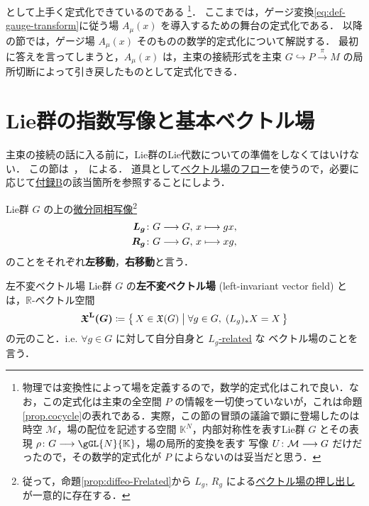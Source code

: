 \documentclass[geometry_main]{subfiles}
\begin{document}
として上手く定式化できているのである
\footnote{
    物理では変換性によって場を定義するので，数学的定式化はこれで良い．なお，この定式化は主束の全空間 $P$ の情報を一切使っていないが，これは命題\ref{prop.cocycle}の表れである．実際，この節の冒頭の議論で顕に登場したのは時空 $\mathcal{M}$，場の配位を記述する空間 $\mathbb{K}^N$，内部対称性を表すLie群 $G$ とその表現 $\rho \colon G \lto \gGL{N}{\mathbb{K}}$，場の局所的変換を表す \cinfty 写像 $U \colon \mathcal{M} \longrightarrow G$ だけだったので，その数学的定式化が $P$ によらないのは妥当だと思う．
}．
ここまでは，ゲージ変換\eqref{eq:def-gauge-transform}に従う場 $A_\mu(x)$ を導入するための舞台の定式化である．
以降の節では，ゲージ場 $A_\mu(x)$ そのものの数学的定式化について解説する．
最初に答えを言ってしまうと，$A_\mu(x)$ は，主束の接続形式を主束 $G \hookrightarrow P \xrightarrow{\pi} M$ の局所切断によって引き戻したものとして定式化できる．

\section{Lie群の指数写像と基本ベクトル場}

主束の接続の話に入る前に，Lie群のLie代数についての準備をしなくてはいけない．
この節は~\cite[Chapter 20]{Lee12}，~\cite[第6章]{Imano}による．
道具として\hyperref[thm:fundamental-flow]{ベクトル場のフロー}を使うので，必要に応じて\hyperref[appendixB]{付録B}の該当箇所を参照することにしよう．

Lie群 $G$ の上の\underline{微分同相写像}\footnote{従って，命題\ref{prop:diffeo-Frelated}から $L_g,\, R_g$ による\hyperref[prop:diffeo-Frelated]{ベクトル場の押し出し}が一意的に存在する．}
\begin{align}
    \bm{L_g} \colon G &\longrightarrow G,\, x \longmapsto gx, \\
    \bm{R_g} \colon G &\longrightarrow G,\, x \longmapsto xg, \\
\end{align}
のことをそれぞれ\textbf{左移動}，\textbf{右移動}と言う．

\begin{mydef}[label=def:left-invariant]{左不変ベクトル場}
    Lie群 $G$ の\textbf{左不変ベクトル場} (left-invariant vector field) とは，$\mathbb{R}$-ベクトル空間
    \begin{align}
        \bm{\mathfrak{X}^{\mathrm{L}} (G)} \coloneqq \bigl\{\, X \in \mathfrak{X}(G) \bigm| \forall g \in G,\; (L_g)_* X = X \,\bigr\} 
    \end{align}
    の元のこと．i.e. $\forall g \in G$ に対して自分自身と \hyperref[def:F-related]{$L_g$-related} な \cinfty ベクトル場のことを言う．
\end{mydef}
\end{document}
